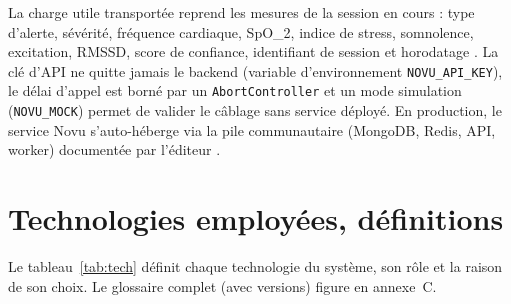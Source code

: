 \documentclass[11pt,a4paper]{article}
\begin{document}
La charge utile transportée reprend les mesures de la session en cours : type d'alerte, sévérité,
fréquence cardiaque, SpO\_2, indice de stress, somnolence, excitation, RMSSD, score de confiance,
identifiant de session et horodatage \cite{novudocs}. La clé d'API ne quitte jamais le backend
(variable d'environnement \texttt{NOVU\_API\_KEY}), le délai d'appel est borné par un
\texttt{AbortController} et un mode simulation (\texttt{NOVU\_MOCK}) permet de valider le câblage sans
service déployé. En production, le service Novu s'auto-héberge via la pile communautaire
(MongoDB, Redis, API, worker) documentée par l'éditeur \cite{novudocs}.

\section{Technologies employées, définitions}
\label{sec:tech}

Le tableau~\ref{tab:tech} définit chaque technologie du système, son rôle et la raison de son choix.
Le glossaire complet (avec versions) figure en annexe~C.
\end{document}
